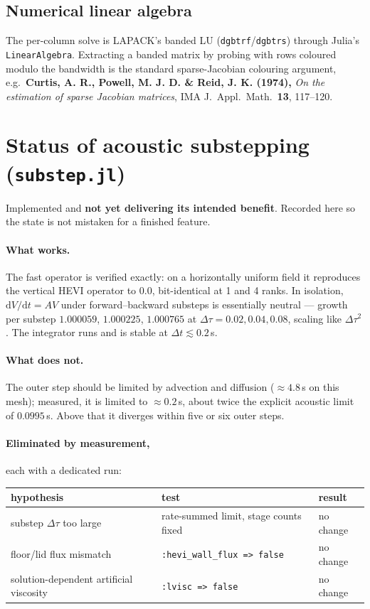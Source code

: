 \documentclass[11pt,a4paper]{article}
\begin{document}
\subsection{Numerical linear algebra}
The per-column solve is LAPACK's banded LU (\texttt{dgbtrf}/\texttt{dgbtrs})
through Julia's \texttt{LinearAlgebra}. Extracting a banded matrix by probing
with rows coloured modulo the bandwidth is the standard sparse-Jacobian
colouring argument, e.g.\ \textbf{Curtis, A. R., Powell, M. J. D. \& Reid,
J. K. (1974),} \emph{On the estimation of sparse Jacobian matrices}, IMA J.\
Appl.\ Math.\ \textbf{13}, 117--120.

\section{Status of acoustic substepping (\texttt{substep.jl})}
Implemented and \textbf{not yet delivering its intended benefit}. Recorded here
so the state is not mistaken for a finished feature.

\paragraph{What works.} The fast operator is verified exactly: on a
horizontally uniform field it reproduces the vertical HEVI operator to $0.0$,
bit-identical at 1 and 4 ranks. In isolation, $\mathrm{d}V/\mathrm{d}t = AV$
under forward--backward substeps is essentially neutral --- growth per substep
$1.000059$, $1.000225$, $1.000765$ at $\Delta\tau = 0.02, 0.04, 0.08$, scaling
like $\Delta\tau^2$. The integrator runs and is stable at $\Delta t \lesssim
0.2$\,s.

\paragraph{What does not.} The outer step should be limited by advection and
diffusion ($\approx 4.8$\,s on this mesh); measured, it is limited to
$\approx 0.2$\,s, about twice the explicit acoustic limit of $0.0995$\,s.
Above that it diverges within five or six outer steps.

\paragraph{Eliminated by measurement,} each with a dedicated run:
\begin{center}
\begin{tabular}{lll}
\toprule
hypothesis & test & result\\
\midrule
substep $\Delta\tau$ too large & rate-summed limit, stage counts fixed & no change\\
floor/lid flux mismatch & \texttt{:hevi\_wall\_flux => false} & no change\\
solution-dependent artificial viscosity & \texttt{:lvisc => false} & no change\\
\bottomrule
\end{tabular}
\end{center}
\end{document}
